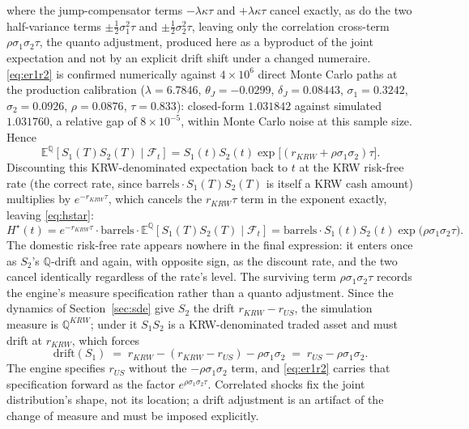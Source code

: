 \documentclass[11pt,a4paper]{article}
\begin{document}
where the jump-compensator terms $-\lambda\kappa\tau$ and $+\lambda\kappa\tau$ cancel exactly, as do the two half-variance terms $\pm\tfrac12\sigma_1^2\tau$ and $\pm\tfrac12\sigma_2^2\tau$, leaving only the correlation cross-term $\rho\sigma_1\sigma_2\tau$, the quanto adjustment, produced here as a byproduct of the joint expectation and not by an explicit drift shift under a changed numeraire. \eqref{eq:er1r2} is confirmed numerically against $4\times10^6$ direct Monte Carlo paths at the production calibration ($\lambda=6.7846$, $\theta_J=-0.0299$, $\delta_J=0.08443$, $\sigma_1=0.3242$, $\sigma_2=0.0926$, $\rho=0.0876$, $\tau=0.833$): closed-form $1.031842$ against simulated $1.031760$, a relative gap of $8\times10^{-5}$, within Monte Carlo noise at this sample size. Hence
\begin{equation}
\mathbb E^{\mathbb Q}[S_1(T)S_2(T)\mid\mathcal F_t] = S_1(t)S_2(t)\exp\big[(r_{KRW}+\rho\sigma_1\sigma_2)\tau\big].
\end{equation}
Discounting this KRW-denominated expectation back to $t$ at the KRW risk-free rate (the correct rate, since $\mathrm{barrels}\cdot S_1(T)S_2(T)$ is itself a KRW cash amount) multiplies by $e^{-r_{KRW}\tau}$, which cancels the $r_{KRW}\tau$ term in the exponent exactly, leaving \eqref{eq:hstar}:
\begin{equation}
H^\star(t) = e^{-r_{KRW}\tau}\cdot\mathrm{barrels}\cdot\mathbb E^{\mathbb Q}[S_1(T)S_2(T)\mid\mathcal F_t] = \mathrm{barrels}\cdot S_1(t)S_2(t)\exp\big(\rho\sigma_1\sigma_2\tau\big).
\end{equation}
The domestic risk-free rate appears nowhere in the final expression: it enters once as $S_2$'s $\mathbb Q$-drift and again, with opposite sign, as the discount rate, and the two cancel identically regardless of the rate's level. The surviving term $\rho\sigma_1\sigma_2\tau$ records the engine's measure specification rather than a quanto adjustment. Since the dynamics of Section~\ref{sec:sde} give $S_2$ the drift $r_{KRW}-r_{US}$, the simulation measure is $\mathbb Q^{KRW}$; under it $S_1S_2$ is a KRW-denominated traded asset and must drift at $r_{KRW}$, which forces
\begin{equation}
\mathrm{drift}(S_1) \;=\; r_{KRW}-(r_{KRW}-r_{US})-\rho\sigma_1\sigma_2 \;=\; r_{US}-\rho\sigma_1\sigma_2 .
\label{eq:driftcorrect}
\end{equation}
The engine specifies $r_{US}$ without the $-\rho\sigma_1\sigma_2$ term, and \eqref{eq:er1r2} carries that specification forward as the factor $e^{\rho\sigma_1\sigma_2\tau}$. Correlated shocks fix the joint distribution's shape, not its location; a drift adjustment is an artifact of the change of measure and must be imposed explicitly.
\end{document}
